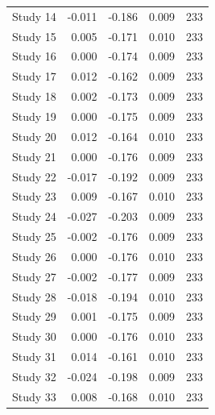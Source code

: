 \begin{table}[!h]
{\begin{tabular}[t]{rrrrr}
\hspace{1em}Study 14 & -0.011 & -0.186 & 0.009 & 233\\
\hspace{1em}Study 15 & 0.005 & -0.171 & 0.010 & 233\\
\hspace{1em}Study 16 & 0.000 & -0.174 & 0.009 & 233\\
\hspace{1em}Study 17 & 0.012 & -0.162 & 0.009 & 233\\
\hspace{1em}Study 18 & 0.002 & -0.173 & 0.009 & 233\\
\hspace{1em}Study 19 & 0.000 & -0.175 & 0.009 & 233\\
\hspace{1em}Study 20 & 0.012 & -0.164 & 0.010 & 233\\
\hspace{1em}Study 21 & 0.000 & -0.176 & 0.009 & 233\\
\hspace{1em}Study 22 & -0.017 & -0.192 & 0.009 & 233\\
\hspace{1em}Study 23 & 0.009 & -0.167 & 0.010 & 233\\
\hspace{1em}Study 24 & -0.027 & -0.203 & 0.009 & 233\\
\hspace{1em}Study 25 & -0.002 & -0.176 & 0.009 & 233\\
\hspace{1em}Study 26 & 0.000 & -0.176 & 0.010 & 233\\
\hspace{1em}Study 27 & -0.002 & -0.177 & 0.009 & 233\\
\hspace{1em}Study 28 & -0.018 & -0.194 & 0.010 & 233\\
\hspace{1em}Study 29 & 0.001 & -0.175 & 0.009 & 233\\
\hspace{1em}Study 30 & 0.000 & -0.176 & 0.010 & 233\\
\hspace{1em}Study 31 & 0.014 & -0.161 & 0.010 & 233\\
\hspace{1em}Study 32 & -0.024 & -0.198 & 0.009 & 233\\
\hspace{1em}Study 33 & 0.008 & -0.168 & 0.010 & 233\\

\end{tabular}}
\end{table}
